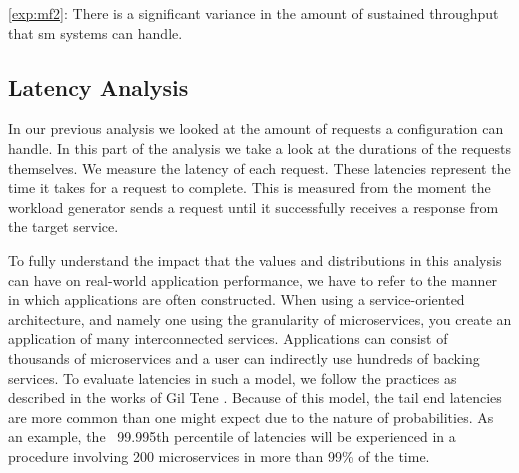 \begin{shaded*}
    \noindent
    \ref{exp:mf2}: 
    There is a significant variance in the amount of sustained throughput that \gls{sm} systems can handle.
\end{shaded*}

\subsection{Latency Analysis}
\label{sec:experiments:results:per-experiment:01:latency}

In our previous analysis we looked at the amount of requests a configuration can handle. In this part of the analysis we take a look at the durations of the requests themselves. We measure the latency of each request. These latencies represent the time it takes for a request to complete. This is measured from the moment the workload generator sends a request until it successfully receives a response from the target service.

To fully understand the impact that the values and distributions in this analysis can have on real-world application performance, we have to refer to the manner in which applications are often constructed. When using a service-oriented architecture, and namely one using the granularity of microservices, you create an application of many interconnected services. Applications can consist of thousands of microservices \cite{design-example-microservices, netflix-microservices-cost} and a user can indirectly use hundreds of backing services. To evaluate latencies in such a model, we follow the practices as described in the works of Gil Tene \cite{Tene2015-measure-latency}. Because of this model, the tail end latencies are more common than one might expect due to the nature of probabilities. As an example, the ~99.995th percentile of latencies will be experienced in a procedure involving 200 microservices in more than 99\% of the time. 


